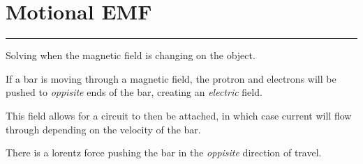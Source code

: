 \pagebreak
\section{Motional EMF}
\hrule
\vspace{.5cm}

Solving when the magnetic field is changing on the object.

If a bar is moving through a magnetic field, the protron and electrons will be pushed to \textit{oppisite} ends of the bar, creating an \textit{electric} field.

This field allows for a circuit to then be attached, in which case current will flow through depending on the velocity of the bar. 

There is a lorentz force pushing the bar in the \textit{oppisite} direction of travel.

